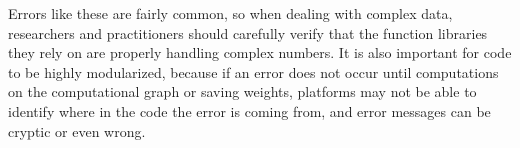 Errors like these are fairly common, so when dealing with complex data, researchers and practitioners should carefully verify that the function libraries they rely on are properly handling complex numbers. It is also important for code to be highly modularized, because if an error does not occur until computations on the computational graph or saving weights, platforms may not be able to identify where in the code the error is coming from, and error messages can be cryptic or even wrong.
